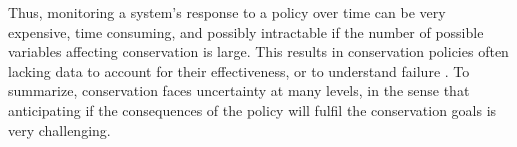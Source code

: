 \documentclass[12pt,a4paper]{article}
\begin{document}
Thus, monitoring a system's response to a policy over time can be very expensive, time consuming, and possibly intractable if the number of possible variables affecting conservation is large.
This results in conservation policies often lacking data to account for their effectiveness, or to understand failure \citep{keith2011uncertainty}.
To summarize, conservation faces uncertainty at many levels, in the sense that anticipating if the consequences of the policy will fulfil the conservation goals is very challenging.
\end{document}
